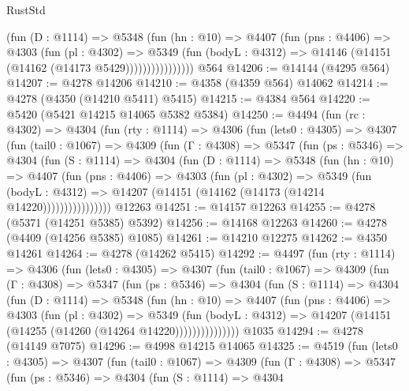\begin{lexlean}{RustStd}
\begin{coremodule}
{\begin{coremodule}
{{{{{{{{{{{{{{{{{{{{{{{{{{{{{{{{{{{                    (fun (D : @1114) =>
                    @5348
                      (fun (hn : @10) =>
                      @4407
                        (fun (pns : @4406) =>
                        @4303
                          (fun (pl : @4302) =>
                          @5349
                            (fun (bodyL : @4312) =>
                            @14146 (@14151 (@14162 (@14173 @5429))))))))))))))))
    @564
@14206 := @14144 (@4295 @564)
@14207 := @4278 @14206
@14210 := @4358 (@4359 @564) @14062
@14214 := @4278 (@4350 (@14210 @5411) @5415)
@14215 := @4384 @564
@14220 := @5420 (@5421 @14215 @14065 @5382 @5384)
@14250 := @4494
    (fun (rc : @4302) =>
    @4304
      (fun (rty : @1114) =>
      @4306
        (fun (lets0 : @4305) =>
        @4307
          (fun (tail0 : @1067) =>
          @4309
            (fun (Γ : @4308) =>
            @5347
              (fun (ps : @5346) =>
              @4304
                (fun (S : @1114) =>
                @4304
                  (fun (D : @1114) =>
                  @5348
                    (fun (hn : @10) =>
                    @4407
                      (fun (pns : @4406) =>
                      @4303
                        (fun (pl : @4302) =>
                        @5349
                          (fun (bodyL : @4312) =>
                          @14207 (@14151 (@14162 (@14173 (@14214 @14220))))))))))))))))
    @12263
@14251 := @14157 @12263
@14255 := @4278 (@5371 (@14251 @5385) @5392)
@14256 := @14168 @12263
@14260 := @4278 (@4409 (@14256 @5385) @1085)
@14261 := @14210 @12275
@14262 := @4350 @14261
@14264 := @4278 (@14262 @5415)
@14292 := @4497
    (fun (rty : @1114) =>
    @4306
      (fun (lets0 : @4305) =>
      @4307
        (fun (tail0 : @1067) =>
        @4309
          (fun (Γ : @4308) =>
          @5347
            (fun (ps : @5346) =>
            @4304
              (fun (S : @1114) =>
              @4304
                (fun (D : @1114) =>
                @5348
                  (fun (hn : @10) =>
                  @4407
                    (fun (pns : @4406) =>
                    @4303
                      (fun (pl : @4302) =>
                      @5349
                        (fun (bodyL : @4312) =>
                        @14207 (@14151 (@14255 (@14260 (@14264 @14220)))))))))))))))
    @1035
@14294 := @4278 (@14149 @7075)
@14296 := @4998 @14215 @14065
@14325 := @4519
    (fun (lets0 : @4305) =>
    @4307
      (fun (tail0 : @1067) =>
      @4309
        (fun (Γ : @4308) =>
        @5347
          (fun (ps : @5346) =>
          @4304
            (fun (S : @1114) =>
            @4304
}}}}}}}}}}}}}}}}}}}}}}}}}}}}}}}}}}}
\end{coremodule}}
\end{coremodule}
\end{lexlean}
